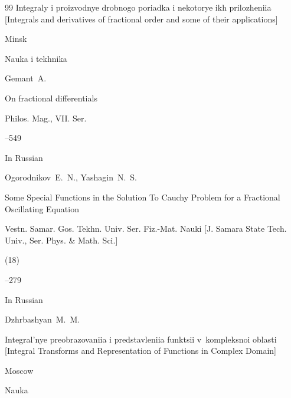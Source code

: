 \begin{thebibliography}{99}
\book Integraly i proizvodnye drobnogo poriadka i nekotorye ikh prilozheniia \rm [Integrals and derivatives of fractional order and some of their applications]

\publaddr Minsk

\publ Nauka i tekhnika








\by Gemant~A. 

\paper On fractional differentials

\jour Philos. Mag., VII. Ser.


--549 










\lang In Russian

\by Ogorodnikov~E.~N., Yashagin~N.~S.

\paper Some Special Functions in the Solution To Cauchy Problem for a Fractional Oscillating Equation

\jour Vestn. Samar. Gos. Tekhn. Univ. Ser. Fiz.-Mat. Nauki \rm [J. Samara State Tech. Univ., Ser. Phys. \& Math. Sci.]


(18)

--279







\lang In Russian

\by Dzhrbashyan~M.~M.

\book Integral'nye preobrazovaniia i predstavleniia funktsii v~kompleksnoi oblasti \rm [Integral Transforms and Representation of Functions in Complex Domain]

\publaddr Moscow

\publ Nauka








\end{thebibliography}
